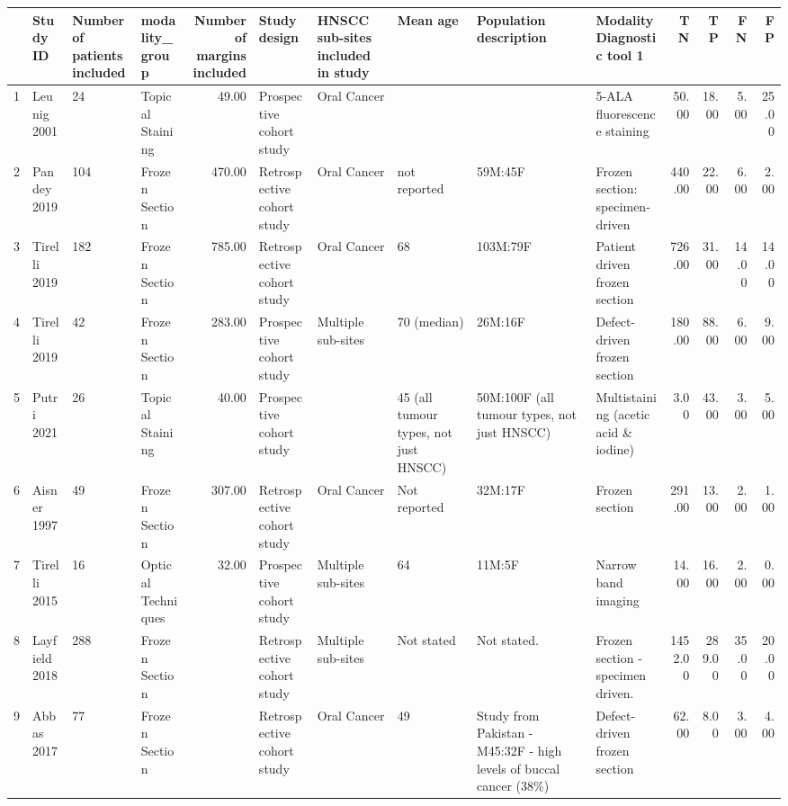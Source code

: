 \begin{table}[ht]
\centering
\begingroup\tiny
\begin{tabular}{rlllrlllllrrrr}
  \hline
 & Study ID & Number of patients included & modality\_group & Number of margins included & Study design & HNSCC sub-sites included in study & Mean age & Population description & Modality Diagnostic tool 1 & TN & TP & FN & FP \\ 
  \hline
1 & Leunig 2001 & 24 & Topical Staining & 49.00 & Prospective cohort study & Oral Cancer &  &  & 5-ALA fluorescence staining & 50.00 & 18.00 & 5.00 & 25.00 \\ 
  2 & Pandey 2019 & 104 & Frozen Section & 470.00 & Retrospective cohort study & Oral Cancer & not reported & 59M:45F & Frozen section: specimen-driven & 440.00 & 22.00 & 6.00 & 2.00 \\ 
  3 & Tirelli 2019 & 182 & Frozen Section & 785.00 & Retrospective cohort study & Oral Cancer & 68 & 103M:79F & Patient driven frozen section & 726.00 & 31.00 & 14.00 & 14.00 \\ 
  4 & Tirelli 2019 & 42 & Frozen Section & 283.00 & Prospective cohort study & Multiple sub-sites & 70 (median) & 26M:16F & Defect-driven frozen section & 180.00 & 88.00 & 6.00 & 9.00 \\ 
  5 & Putri 2021 & 26 & Topical Staining & 40.00 & Prospective cohort study &  & 45 (all tumour types, not just HNSCC) & 50M:100F (all tumour types, not just HNSCC) & Multistaining (acetic acid \& iodine) & 3.00 & 43.00 & 3.00 & 5.00 \\ 
  6 & Aisner 1997 & 49 & Frozen Section & 307.00 & Retrospective cohort study & Oral Cancer & Not reported & 32M:17F & Frozen section & 291.00 & 13.00 & 2.00 & 1.00 \\ 
  7 & Tirelli 2015 & 16 & Optical Techniques & 32.00 & Prospective cohort study & Multiple sub-sites & 64 & 11M:5F & Narrow band imaging & 14.00 & 16.00 & 2.00 & 0.00 \\ 
  8 & Layfield 2018 & 288 & Frozen Section &  & Retrospective cohort study & Multiple sub-sites & Not stated & Not stated. & Frozen section -specimen driven. & 1452.00 & 289.00 & 35.00 & 20.00 \\ 
  9 & Abbas 2017 & 77 & Frozen Section &  & Retrospective cohort study & Oral Cancer & 49 & Study from Pakistan - M45:32F - high levels of buccal cancer (38\%) & Defect-driven frozen section & 62.00 & 8.00 & 3.00 & 4.00 \\ 

\end{tabular}
\end{table}
